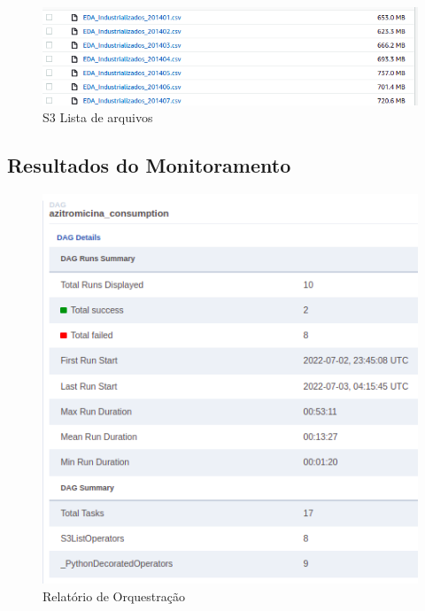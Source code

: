 \documentclass[10pt,brazil]{beamer}
\theoremstyle{definition}
\begin{document}
\begin{frame}[plain]
  \hspace*{-10mm}
  \begin{figure}
    \centering  
  \includegraphics[width=.75\paperwidth]{s3_size.png}
      \caption{S3 Lista de arquivos}
  \end{figure}  
\end{frame}

\subsection{Resultados do Monitoramento}

\begin{frame}[plain]
  \hspace*{-10mm}
  \begin{figure}
    \centering  
  \includegraphics[width=.5\paperwidth]{report_execution_summary1.png}
      \caption[Airflow relatório]{Relatório de Orquestração}
  \end{figure}  
\end{frame}
\end{document}
